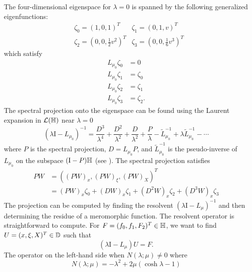 The four-dimensional eigenspace for \(\lambda = 0\) is spanned by the following generalized eigenfunctions:
\begin{equation}
	\begin{aligned}
		&\zeta_0 = (1,0,1)^T  &\zeta_1 = (0,1,v)^T \\
		&\zeta_2 = (0, 0, \frac 12 v^2)^T & \zeta_3 = (0,0,\frac 1 6 v^3)^T
	\end{aligned}
\end{equation}
which satisfy
\begin{equation}
	\begin{aligned}
		L_{\mu_0} \zeta_0 &= 0 \\
		L_{\mu_0} \zeta_1 &= \zeta_0 \\
		L_{\mu_0} \zeta_2 &= \zeta_1 \\
		L_{\mu_0} \zeta_3 &= \zeta_2.
	\end{aligned}
\end{equation}
The spectral projection onto the eigenspace can be found using the Laurent expansion in \(\mathcal{L}(\mathbb{H})\) near \(\lambda = 0\)
\begin{equation}
	(\lambda \mathrm I - L_{\mu_0} )^{-1} = \frac{D^3}{\lambda^4} + \frac{D^2}{\lambda^2} + \frac{D}{\lambda^2} + \frac P \lambda - \tilde L _{\mu_0} ^{-1} + \lambda \tilde L_{\mu_0} ^{-1} - \cdots
\end{equation}
where \(P\) is the spectral projection, \(D = L_{\mu_0} P\), and \(\tilde L _{\mu_0} ^{-1}\) is the pseudo-inverse of \(L_{\mu_0}\) on the subspace \((\mathrm I - P)\mathbb{H}\) (see \cite{kato2013perturbation}). The spectral projection satisfies
\begin{equation}
\begin{aligned}
	PW &= ((PW)_x, (PW)_\xi, (PW)_X)^T \\
	&= (PW)_x \zeta_0 + (DW)_x\zeta_1 + (D^2W)_x\zeta_2 + (D^3W)_x \zeta_3
\end{aligned}
\end{equation}
The projection can be computed by finding the resolvent \((\lambda \mathrm I - L_\mu)^{-1}\) and then determining the residue of a meromorphic function. The resolvent operator is straightforward to compute. For \(F=(f_0,f_1,F_2)^T\in\mathbb{H}\), we want to find \(U = (x,\xi, X)^T\in \mathbb{D}\) such that
\begin{equation}
	(\lambda\mathrm I - L_\mu) U = F.
\end{equation}
The operator on the left-hand side when \(N(\lambda ;\mu) \neq 0\) where 
\begin{equation}
	N(\lambda;\mu) = - \lambda^2 + 2\mu(\cosh \lambda - 1)
\end{equation}
